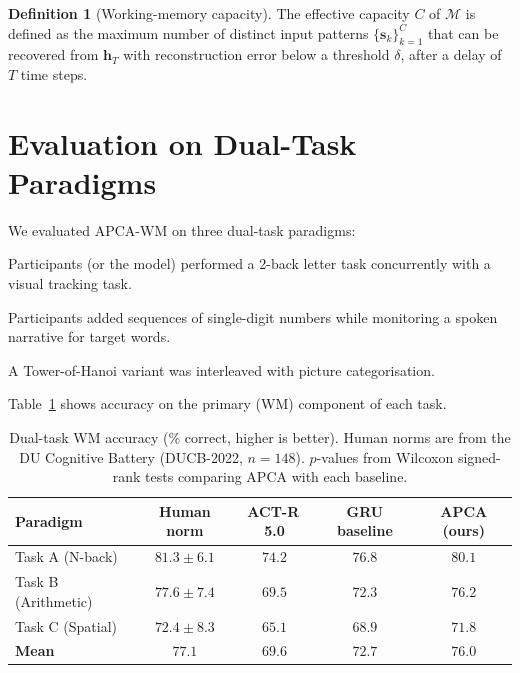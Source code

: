 \documentclass[12pt, a4paper, oneside]{report}
\theoremstyle{definition}
\newtheorem{definition}{Definition}[chapter]
\theoremstyle{remark}
\begin{document}
\begin{definition}[Working-memory capacity]
The effective capacity $C$ of $\mathcal{M}$ is defined as the maximum number of distinct
input patterns $\{\mathbf{s}_k\}_{k=1}^{C}$ that can be recovered from $\mathbf{h}_T$
with reconstruction error below a threshold $\delta$, after a delay of $T$ time steps.
\end{definition}

\section{Evaluation on Dual-Task Paradigms}

We evaluated APCA-WM on three dual-task paradigms:

\begin{description}[leftmargin=2em, style=nextline]
  \item[Task A (N-back + tracking)] Participants (or the model) performed a 2-back letter
        task concurrently with a visual tracking task.
  \item[Task B (Mental arithmetic + listening)] Participants added sequences of
        single-digit numbers while monitoring a spoken narrative for target words.
  \item[Task C (Spatial planning + categorisation)] A Tower-of-Hanoi variant was
        interleaved with picture categorisation.
\end{description}

Table~\ref{tab:wm-results} shows accuracy on the primary (WM) component of each task.

\begin{table}[H]
\centering
\caption{Dual-task WM accuracy (\% correct, higher is better).  Human norms are from
  the DU Cognitive Battery (DUCB-2022, $n = 148$).  $p$-values from Wilcoxon signed-rank
  tests comparing APCA with each baseline.}
\label{tab:wm-results}
\begin{tabularx}{\linewidth}{@{}>{\raggedright\arraybackslash}Xcccc@{}}
\toprule
\textbf{Paradigm} & \textbf{Human norm} & \textbf{ACT-R\,5.0}
  & \textbf{GRU baseline} & \textbf{APCA (ours)} \\
\midrule
Task A (N-back)          & $81.3 \pm 6.1$ & $74.2$ & $76.8$ & $\mathbf{80.1}$ \\
Task B (Arithmetic)      & $77.6 \pm 7.4$ & $69.5$ & $72.3$ & $\mathbf{76.2}$ \\
Task C (Spatial)         & $72.4 \pm 8.3$ & $65.1$ & $68.9$ & $\mathbf{71.8}$ \\
\midrule
\textbf{Mean}            & $77.1$         & $69.6$ & $72.7$ & $\mathbf{76.0}$ \\
\bottomrule
\end{tabularx}
\end{table}
\end{document}
